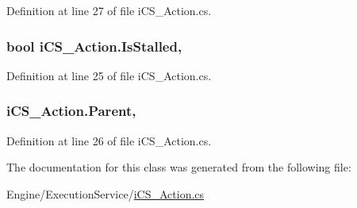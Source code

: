 Definition at line 27 of file i\+C\+S\+\_\+\+Action.\+cs.

\hypertarget{classi_c_s___action_aad70f9d06727a67c8eb5b7b318609f36}{
\subsubsection[{Is\+Stalled}]{\setlength{\rightskip}{0pt plus 5cm}bool i\+C\+S\+\_\+\+Action.\+Is\+Stalled\hspace{0.3cm}{\ttfamily [get]}, {\ttfamily [set]}}}\label{classi_c_s___action_aad70f9d06727a67c8eb5b7b318609f36}


Definition at line 25 of file i\+C\+S\+\_\+\+Action.\+cs.

\hypertarget{classi_c_s___action_a027cf604231c4e3df565a6f5b5e04b3c}{
\subsubsection[{Parent}]{ i\+C\+S\+\_\+\+Action.\+Parent\hspace{0.3cm}{\ttfamily [get]}, {\ttfamily [set]}}}\label{classi_c_s___action_a027cf604231c4e3df565a6f5b5e04b3c}


Definition at line 26 of file i\+C\+S\+\_\+\+Action.\+cs.



The documentation for this class was generated from the following file\+:\begin{DoxyCompactItemize}
\item 
Engine/\+Execution\+Service/\hyperlink{i_c_s___action_8cs}{i\+C\+S\+\_\+\+Action.\+cs}\end{DoxyCompactItemize}

